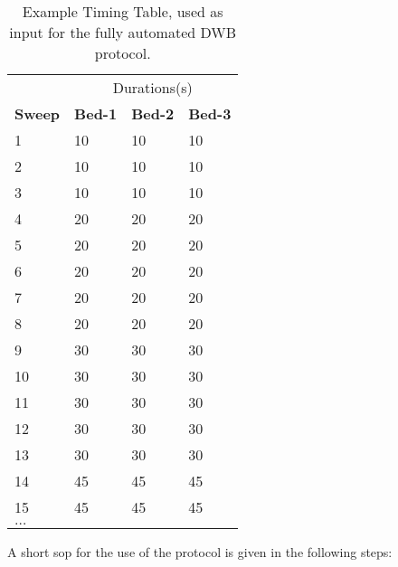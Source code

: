 \begin{table}[ht!]
\centering
\label{tab:TimmingTable}
\caption{Example Timing Table, used as input for the fully automated DWB protocol.}
\begin{tabular}{|l|l|l|l|}
\toprule
\textbf{} & \multicolumn{3}{c|}{Durations(s)} \\ 
\textbf{Sweep} & \textbf{Bed-1} & \textbf{Bed-2} & \textbf{Bed-3} \\
\midrule
1     & 10    & 10   & 10    \\
2     & 10    & 10                        & 10    \\
3     & 10    & 10                        & 10    \\
4     & 20    & 20                        & 20    \\
5     & 20    & 20                        & 20    \\
6     & 20    & 20                        & 20    \\
7     & 20    & 20                        & 20    \\
8     & 20    & 20                        & 20    \\
9     & 30    & 30                        & 30    \\
10    & 30    & 30                        & 30    \\
11    & 30    & 30                        & 30    \\
12    & 30    & 30                        & 30    \\
13    & 30    & 30                        & 30    \\
14    & 45    & 45                        & 45    \\
15    & 45    & 45                        & 45    \\
\multicolumn{4}{|l|}{$\dots$} \\
\bottomrule
\end{tabular}
\end{table}


A short \gls{sop} for the use of the protocol is given in the following steps:

